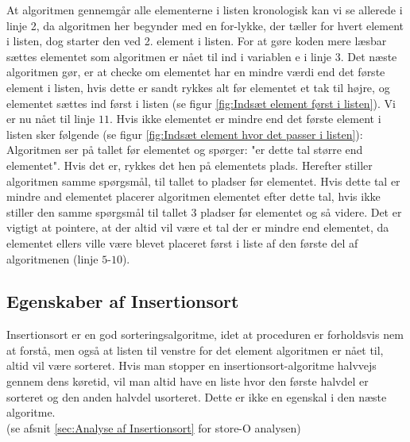 At algoritmen gennemgår alle elementerne i listen kronologisk kan vi se allerede i linje 2, da algoritmen her begynder med en for-lykke, der tæller for hvert element i listen, dog starter den ved 2. element i listen. For at gøre koden mere læsbar sættes elementet som algoritmen er nået til ind i variablen e i linje 3. Det næste algoritmen gør, er at checke om elementet har en mindre værdi end det første element i listen, hvis dette er sandt rykkes alt før elementet et tak til højre, og elementet sættes ind først i listen (se figur \ref{fig:Indsæt element først i listen}). Vi er nu nået til linje $11$. Hvis ikke elementet er mindre end det første element i listen sker følgende (se figur \ref{fig:Indsæt element hvor det passer i listen}): Algoritmen ser på tallet før elementet og spørger: "er dette tal større end elementet". Hvis det er, rykkes det hen på elementets plads. Herefter stiller algoritmen samme spørgsmål, til tallet to pladser før elementet. Hvis dette tal er mindre and elementet placerer algoritmen elementet efter dette tal, hvis ikke stiller den samme spørgsmål til tallet 3 pladser før elementet og så videre. Det er vigtigt at pointere, at der altid vil være et tal der er mindre end elementet, da elementet ellers ville være blevet placeret først i liste af den første del af algoritmenen (linje $5$-$10$).\\

\subsection{Egenskaber af Insertionsort}%
\label{sub:Egenskaber af Insertionsort}
Insertionsort er en god sorteringsalgoritme, idet at proceduren er forholdsvis nem at forstå, men også at listen til venstre for det element algoritmen er nået til, altid vil være sorteret. Hvis man stopper en insertionsort-algoritme halvvejs gennem dens køretid, vil man altid have en liste hvor den første halvdel er sorteret og den anden halvdel usorteret. Dette er ikke en egenskal i den næste algoritme.\\

(se afsnit \ref{sec:Analyse af Insertionsort} for store-O analysen)

